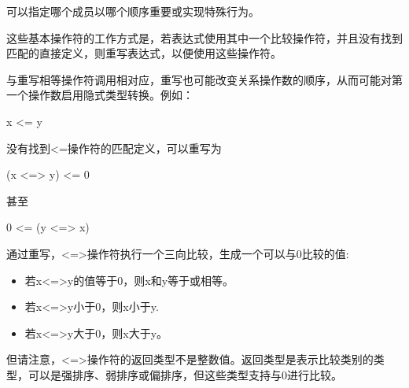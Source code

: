 可以指定哪个成员以哪个顺序重要或实现特殊行为。

这些基本操作符的工作方式是，若表达式使用其中一个比较操作符，并且没有找到匹配的直接定义，则重写表达式，以便使用这些操作符。

与重写相等操作符调用相对应，重写也可能改变关系操作数的顺序，从而可能对第一个操作数启用隐式类型转换。例如：

\begin{cpp}
x <= y
\end{cpp}

没有找到<=操作符的匹配定义，可以重写为

\begin{cpp}
(x <=> y) <= 0
\end{cpp}

甚至

\begin{cpp}
0 <= (y <=> x)
\end{cpp}

通过重写，<=>操作符执行一个三向比较，生成一个可以与0比较的值:

\begin{itemize}
\item
若x<=>y的值等于0，则x和y等于或相等。

\item
若x<=>y小于0，则x小于y.

\item
若x<=>y大于0，则x大于y。
\end{itemize}

但请注意，<=>操作符的返回类型不是整数值。返回类型是表示比较类别的类型，可以是强排序、弱排序或偏排序，但这些类型支持与0进行比较。










